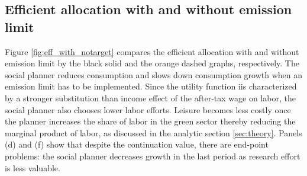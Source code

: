 \subsection{Efficient allocation with and without emission limit}
Figure \ref{fig:eff_with_notarget} compares the efficient allocation with and without emission limit by the black solid and the orange dashed graphs, respectively.  
The social planner reduces consumption and slows down consumption growth when an emission limit has to be implemented. 
Since the utility function iis characterized by a stronger substitution than income effect of the after-tax wage on labor, the social planner also chooses lower labor efforts. Leisure becomes less costly once the planner increases the share of labor in the green sector thereby reducing the marginal product of labor, as discussed in the analytic section \ref{sec:theory}. 
Panels (d) and (f) show that despite the continuation value, there are end-point problems: the social planner decreases growth in the last period as research effort is less valuable. 
